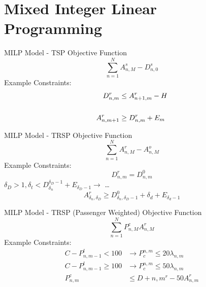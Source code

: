 \documentclass[aspectratio=169]{beamer}
\begin{document}
\section{Mixed Integer Linear Programming}

\begin{frame}{MILP Model - TSP}
    Objective Function
    \begin{equation*}\label{eq:milp-tsp-obj}
        \sum_{n=1}^{N}{A_{n,M}^{s}-D_{n,0}^{s}}
    \end{equation*}
    Example Constraints:
    \begin{align*}
        D_{n,m}^{r} &\leq A_{{n+1},m}^{r} - H \\
        \vspace{1em} \\
        A_{n,{m+1}}^{r} &\geq D_{n,m}^{r}+E_m
    \end{align*}
\end{frame}

\begin{frame}{MILP Model - TRSP}
    Objective Function
    \begin{equation*}\label{eq:milp-tsp-obj-2}
        \sum_{n=1}^{N}{A_{n,M}^{r} - A_{n,M}^{o}}
    \end{equation*}
    Example Constraints:
    \begin{equation*}
        D_{n,m}^{r} = D_{n,m}^{0} %
    \end{equation*}
    \hspace{35pt}$\delta_D > 1, \delta_t < D_{\delta_n}^{\delta_D -1}+E_{\delta_{D}-1}\rightarrow$ \dots
    \begin{equation*}
        A_{\delta_n,\delta_D}^{r} \geq D_{\delta_n,\delta_D -1}^{0} + \delta_d + E_{\delta_d - 1} %
    \end{equation*}
\end{frame}

\begin{frame}{MILP Model - TRSP (Passenger Weighted)}
    Objective Function
    \begin{equation*}\label{eq:milp-tsp-obj-3}
        \sum_{n=1}^{N}{P_{n,M}^{c} A_{n,M}^{r}}
    \end{equation*}
    Example Constraints:
    \begin{align*}
        C-P_{n,{m-1}}^{l} < 100 &\rightarrow P_{c}^{n,m} \leq 20\lambda_{n,m} \\
        C-P_{n,{m-1}}^{l} \geq 100 &\rightarrow P_{c}^{n,m} \leq 50\lambda_{n,m} \\
        P_{n,m}^{c} &\leq D+{n,m}^{r} - 50 A_{n,m}^{r}
    \end{align*}
\end{frame}
\end{document}

